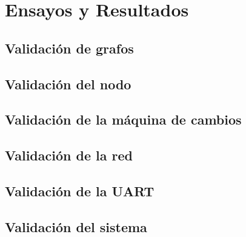 
\chapter{Ensayos y Resultados} %

\label{Chapter4} %




\section{Validación de grafos}
\section{Validación del nodo}
\section{Validación de la máquina de cambios}
\section{Validación de la red}
\section{Validación de la UART}
\section{Validación del sistema}